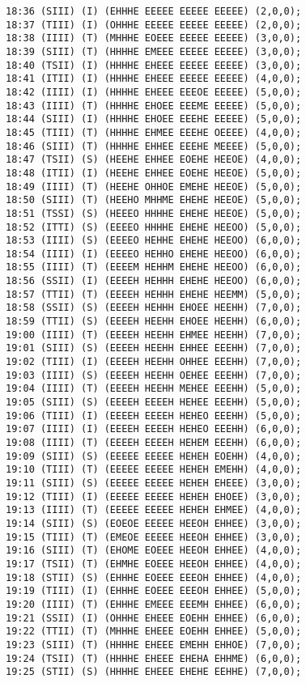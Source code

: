 \documentclass[a4paper]{article}   %
\begin{document}
\begin{CJK}{UTF8}{gbsn}
\begin{spacing}{1.2}
\begin{lstlisting}
18:36 (SIII) (I) (EHHHE EEEEE EEEEE EEEEE) (2,0,0);
18:37 (TIII) (I) (OHHHE EEEEE EEEEE EEEEE) (2,0,0);
18:38 (IIII) (T) (MHHHE EOEEE EEEEE EEEEE) (3,0,0);
18:39 (SIII) (T) (HHHHE EMEEE EEEEE EEEEE) (3,0,0);
18:40 (TSII) (I) (HHHHE EHEEE EEEEE EEEEE) (3,0,0);
18:41 (ITII) (I) (HHHHE EHEEE EEEEE EEEEE) (4,0,0);
18:42 (IIII) (I) (HHHHE EHEEE EEEOE EEEEE) (5,0,0);
18:43 (IIII) (T) (HHHHE EHOEE EEEME EEEEE) (5,0,0);
18:44 (SIII) (I) (HHHHE EHOEE EEEHE EEEEE) (5,0,0);
18:45 (TIII) (T) (HHHHE EHMEE EEEHE OEEEE) (4,0,0);
18:46 (SIII) (T) (HHHHE EHHEE EEEHE MEEEE) (5,0,0);
18:47 (TSII) (S) (HEEHE EHHEE EOEHE HEEOE) (4,0,0);
18:48 (ITII) (I) (HEEHE EHHEE EOEHE HEEOE) (5,0,0);
18:49 (IIII) (T) (HEEHE OHHOE EMEHE HEEOE) (5,0,0);
18:50 (SIII) (T) (HEEHO MHHME EHEHE HEEOE) (5,0,0);
18:51 (TSSI) (S) (HEEEO HHHHE EHEHE HEEOE) (5,0,0);
18:52 (ITTI) (S) (EEEEO HHHHE EHEHE HEEOO) (5,0,0);
18:53 (IIII) (S) (EEEEO HEHHE EHEHE HEEOO) (6,0,0);
18:54 (IIII) (I) (EEEEO HEHHO EHEHE HEEOO) (6,0,0);
18:55 (IIII) (T) (EEEEM HEHHM EHEHE HEEOO) (6,0,0);
18:56 (SSII) (I) (EEEEH HEHHH EHEHE HEEOO) (6,0,0);
18:57 (TTII) (T) (EEEEH HEHHH EHEHE HEEMM) (5,0,0);
18:58 (SSII) (S) (EEEEH HEHHH EHOEE HEEHH) (7,0,0);
18:59 (TTII) (S) (EEEEH HEEHH EHOEE HEEHH) (6,0,0);
19:00 (IIII) (T) (EEEEH HEEHH EHMEE HEEHH) (7,0,0);
19:01 (SIII) (S) (EEEEH HEEHH EHHEE EEEHH) (7,0,0);
19:02 (TIII) (I) (EEEEH HEEHH OHHEE EEEHH) (7,0,0);
19:03 (IIII) (S) (EEEEH HEEHH OEHEE EEEHH) (7,0,0);
19:04 (IIII) (T) (EEEEH HEEHH MEHEE EEEHH) (5,0,0);
19:05 (SIII) (S) (EEEEH EEEEH HEHEE EEEHH) (5,0,0);
19:06 (TIII) (I) (EEEEH EEEEH HEHEO EEEHH) (5,0,0);
19:07 (IIII) (I) (EEEEH EEEEH HEHEO EEEHH) (6,0,0);
19:08 (IIII) (T) (EEEEH EEEEH HEHEM EEEHH) (6,0,0);
19:09 (SIII) (S) (EEEEE EEEEE HEHEH EOEHH) (4,0,0);
19:10 (TIII) (T) (EEEEE EEEEE HEHEH EMEHH) (4,0,0);
19:11 (SIII) (S) (EEEEE EEEEE HEHEH EHEEE) (3,0,0);
19:12 (TIII) (I) (EEEEE EEEEE HEHEH EHOEE) (3,0,0);
19:13 (IIII) (T) (EEEEE EEEEE HEHEH EHMEE) (4,0,0);
19:14 (SIII) (S) (EOEOE EEEEE HEEOH EHHEE) (3,0,0);
19:15 (TIII) (T) (EMEOE EEEEE HEEOH EHHEE) (3,0,0);
19:16 (SIII) (T) (EHOME EOEEE HEEOH EHHEE) (4,0,0);
19:17 (TSII) (T) (EHMHE EOEEE HEEOH EHHEE) (4,0,0);
19:18 (STII) (S) (EHHHE EOEEE EEEOH EHHEE) (4,0,0);
19:19 (TIII) (I) (EHHHE EOEEE EEEOH EHHEE) (5,0,0);
19:20 (IIII) (T) (EHHHE EMEEE EEEMH EHHEE) (6,0,0);
19:21 (SSII) (I) (OHHHE EHEEE EOEHH EHHEE) (6,0,0);
19:22 (TTII) (T) (MHHHE EHEEE EOEHH EHHEE) (5,0,0);
19:23 (SIII) (T) (HHHHE EHEEE EMEHH EHHOE) (7,0,0);
19:24 (TSII) (T) (HHHHE EHEEE EHEHA EHHME) (6,0,0);
19:25 (STII) (S) (HHHHE EHEEE EHEHE EEHHE) (7,0,0);

\end{lstlisting}
\end{spacing}
\end{CJK}
\end{document}
